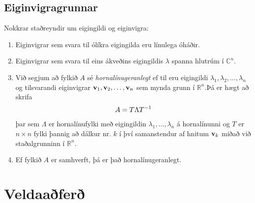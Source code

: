 \documentclass[letterpaper,10pt,icelandic]{sphinxmanual}
\begin{document}
\subsection{Eiginvigragrunnar}
\label{kafli09:eiginvigragrunnar}\label{kafli09:index-2}
Nokkrar staðreyndir um eigingildi og eiginvigra:
\begin{enumerate}
\item {} 
Eiginvigrar sem svara til ólíkra eigingilda eru línulega óháðir.

\item {} 
Eiginvigrar sem svara til eins ákveðins eigingildis \(\lambda\)
spanna hlutrúm í \({{\mathbb  C}}^n\).

\item {} 
Við segjum að fylkið \(A\) sé \emph{hornalínugeranlegt} ef til eru
eigingildi \(\lambda_1,\lambda_2,\dots,\lambda_n\) og tilsvarandi
eiginvigrar
\({\mbox{${\bf v}$}}_1,{\mbox{${\bf v}$}}_2,\dots,{\mbox{${\bf v}$}}_n\)
sem mynda grunn í \({{\mathbb  R}}^n\).Þá er hægt að skrifa
\begin{gather}
\begin{split}A=T\Lambda T^{-1}\end{split}\notag
\end{gather}
þar sem \(\Lambda\) er hornalínufylki með eigingildin
\(\lambda_1,\dots,\lambda_n\) á hornalínunni og \(T\) er
\(n\times n\) fylki þannig að dálkur nr. \(k\) í því
samanstendur af hnitum \({\mbox{${\bf v}$}}_k\) miðað við
staðalgrunninn í \({{\mathbb  R}}^n\).

\item {} 
Ef fylkið \(A\) er samhverft, þá er það hornalínugeranlegt.

\end{enumerate}


\section{Veldaaðferð}
\label{kafli09:index-3}\label{kafli09:veldaafer}
\end{document}
